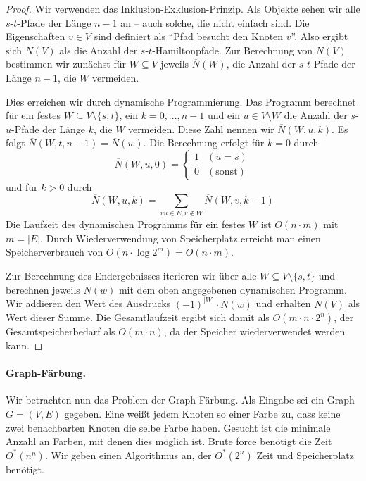   \begin{proof}
    Wir verwenden das Inklusion-Exklusion-Prinzip. Als Objekte sehen wir alle \(s\)-\(t\)-Pfade der Länge \(n - 1\) an -- auch solche, die nicht einfach sind. Die Eigenschaften \(v \in V\) sind definiert als "`Pfad besucht den Knoten \(v\)"'. Also ergibt sich \(N(V)\) als die Anzahl der \(s\)-\(t\)-Hamiltonpfade. Zur Berechnung von \(N(V)\) bestimmen wir zunächst für \(W \subseteq V\) jeweils \(\overline{N}(W)\), die Anzahl der \(s\)-\(t\)-Pfade der Länge \(n - 1\), die \(W\) vermeiden. 
    
    Dies erreichen wir durch dynamische Programmierung. Das Programm berechnet für ein festes \(W \subseteq V \setminus \{s,t\}\), ein \(k = 0,...,n-1\) und ein \(u \in V \setminus W\) die Anzahl der \(s\)-\(u\)-Pfade der Länge \(k\), die \(W\) vermeiden. Diese Zahl nennen wir \(\overline{N}(W,u,k)\). Es folgt \(\overline{N}(W,t,n-1) = \overline{N}(w)\). Die Berechnung erfolgt für \(k = 0\) durch
    \[
      \overline{N}(W,u,0) = 
      \begin{cases}
        1 & (u = s) \\
        0 & (\text{sonst})
      \end{cases}
    \]
    und für \(k > 0\) durch
    \[
      \overline{N}(W,u,k) = \sum_{vu \in E, v \notin W} \overline{N}(W,v,k-1)
    \]
    Die Laufzeit des dynamischen Programms für ein festes \(W\) ist \( O(n \cdot m) \) mit \(m = |E|\). Durch Wiederverwendung von Speicherplatz erreicht man einen Speicherverbrauch von \( O(n \cdot \log 2^m ) = O(n \cdot m) \).
    
    Zur Berechnung des Endergebnisses iterieren wir über alle \(W \subseteq V \setminus \{s,t\}\) und berechnen jeweils \( \overline{N}(w) \) mit dem oben angegebenen dynamischen Programm. Wir addieren den Wert des Ausdrucks \( (-1)^{|W|} \cdot \overline{N}(w) \) und erhalten \(N(V)\) als Wert dieser Summe. Die Gesamtlaufzeit ergibt sich damit als \(O(m \cdot n \cdot 2^n)\), der Gesamtspeicherbedarf als \(O(m \cdot n)\), da der Speicher wiederverwendet werden kann.
  \end{proof}
  
  \paragraph*{Graph-Färbung.} Wir betrachten nun das Problem der Graph-Färbung. Als Eingabe sei ein Graph \(G = (V,E)\) gegeben. Eine  weißt jedem Knoten so einer Farbe zu, dass keine zwei benachbarten Knoten die selbe Farbe haben. Gesucht ist die minimale Anzahl an Farben, mit denen dies möglich ist. Brute force benötigt die Zeit \( O^*(n^n) \). Wir geben einen Algorithmus an, der \(O^*(2^n)\) Zeit und Speicherplatz benötigt.
  
